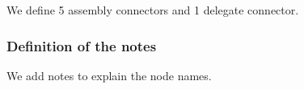 \documentclass[a4paper,11pt]{report}
\begin{document}
We define 5 assembly connectors and 1 delegate connector.

\medskip

\vspace{-0.4cm}
{\color{red!70!black}}

\begin{center}
\end{center}

\subsubsection{Definition of the notes}

We add notes to explain the node names.

\medskip

\vspace{-0.4cm}
{\color{red!70!black}}

\begin{center}
\end{center}

\end{document}
